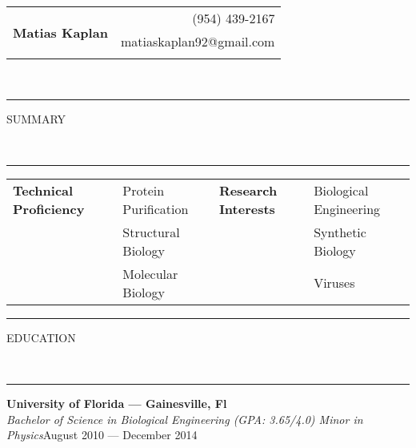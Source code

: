 \documentclass[10pt, letterpaper, oneside]{article}
\makeatletter
\newcommand{\name}{Matias Kaplan}
\newcommand{\phone}{(954) 439-2167}
\newcommand{\email}{matiaskaplan92@gmail.com}
\newcommand{\HRule}[2]{\textcolor{#1}{\rule{\linewidth}{#2}}}
\newcommand{\sectiontitle}[1]{\begin{minipage}{\textwidth}\HRule{black}{0.25mm}\vspace{-10pt}\begin{center}\large\MakeUppercase{#1}\end{center}\end{minipage}\vspace{-5pt}\\\HRule{light-grey}{0.15mm}\vspace{\baselineskip}}
\newenvironment{ressection}[1]{
  \sectiontitle{#1}}
  {\vspace{-\baselineskip}}
\newenvironment{tightressection}[1]{
  \begin{minipage}{\textwidth}
  \sectiontitle{#1}}
  {\vspace{\baselineskip}\end{minipage}}
\newcommand{\resedentry}[3]{
  \begin{minipage}{\textwidth}
  \vspace{-10pt}
  \textbf{#1}\\
  \textit{#2}\hfill\textcolor{light-grey}{#3}\\
  \vspace{0.5\baselineskip}
  \end{minipage}
}
\makeatother
\begin{document}
 
\begin{tabularx}{\linewidth}{X r}
\multirow{3}{*}{\Huge\textbf{\name}} & \phone\\ & \email\\\\

\end{tabularx}\\

\begin{ressection}{summary}

\begin{tabular}{  l l l l}
{\bf{Technical Proficiency}} & Protein Purification & {\bf{Research Interests}} & Biological Engineering \\
& Structural Biology & & Synthetic Biology\\  
&  Molecular Biology & & Viruses\\


\end{tabular}
\end{ressection}
 \medskip
\medskip


\begin{tightressection}{education}
  \resedentry{University of Florida --- Gainesville, Fl}{Bachelor of Science in Biological Engineering (GPA: 3.65/4.0) Minor in Physics}{August 2010 --- December 2014}
\end{tightressection}
\end{document}
